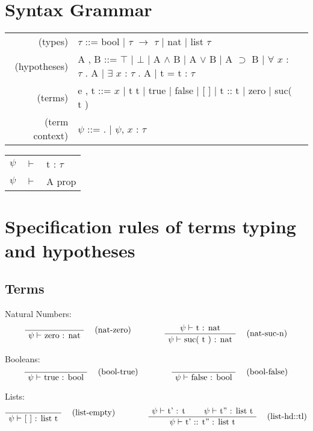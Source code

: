 \documentclass[twoside,a4paper]{article}
\begin{document}
\maketitle

\section{Syntax Grammar}
\begin{center}
\begin{tabular}{rll}
(types)& $\tau$ ::= bool 
| $\tau$ $\rightarrow$ $\tau $ | nat | list $\tau$
\\
(hypotheses)& A , B ::= $\top$ | $\bot$
| A $\wedge$ B | A $\vee$ B | A $\supset$ B 
| $\forall$ $x$ : $\tau$ . A | $\exists$ $x$ : $\tau$ . A
| t = t : $\tau$
\\
(terms)& e , t ::= $x$ | t t | true | false 
| [ ] | t :: t  %
| zero | suc( t ) %
\\
(term context)& $\psi$ ::= . | $\psi$, $x$ : $\tau$
\end{tabular}

\begin{tabular}{rll}
$\psi$ &$\vdash$ & t : $\tau$\\
$\psi$ &$\vdash$ & A prop
\end{tabular}
\end{center}

\section{Specification rules of terms typing and hypotheses}

\subsection{Terms}
Natural Numbers:
\[
\AxiomC{}
\RightLabel{\quad (nat-zero)}
\UnaryInfC{$\psi \vdash$ zero : nat}
\DisplayProof
\qquad
\qquad
\AxiomC{$\psi \vdash$ t : nat}
\RightLabel{\quad (nat-suc-n)}
\UnaryInfC{$\psi \vdash$ suc( t ) : nat}
\DisplayProof
\]

Booleans:
\[
\AxiomC{}
\RightLabel{\quad (bool-true)}
\UnaryInfC{$\psi \vdash$ true : bool}
\DisplayProof
\qquad
\qquad
\AxiomC{}
\RightLabel{\quad (bool-false)}
\UnaryInfC{$\psi \vdash$ false : bool}
\DisplayProof
\]

Lists:
\[
\AxiomC{}
\RightLabel{\quad (list-empty)}
\UnaryInfC{$\psi \vdash$ [ ] : list t}
\DisplayProof
\qquad
\qquad
\AxiomC{$\psi \vdash$ t' : t}
\AxiomC{$\psi \vdash$ t'' : list t}
\RightLabel{\quad (list-hd::tl)}
\BinaryInfC{$\psi \vdash$ t' :: t'' : list t}
\DisplayProof
\]
\end{document}
